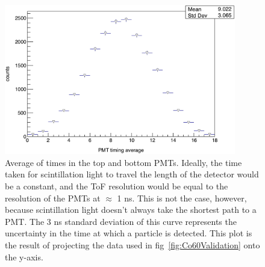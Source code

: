 \begin{figure}
    \centering
    \includegraphics[width = 0.9\textwidth]{Content/Methods/CO60ValidationProject.png}
    \caption{Average of times in the top and bottom PMTs.
    Ideally, the time taken for scintillation light to travel the length of the detector would be a constant, and the ToF resolution would be equal to the resolution of the PMTs at $\approx$ 1 ns.
    This is not the case, however, because scintillation light doesn't always take the shortest path to a PMT.
    The 3 ns standard deviation of this curve represents the uncertainty in the time at which a particle is detected.
    This plot is the result of projecting the data used in fig~\ref{fig:Co60Validation} onto the y-axis.
}
    \label{fig:Co60ValidationProject}
\end{figure}

